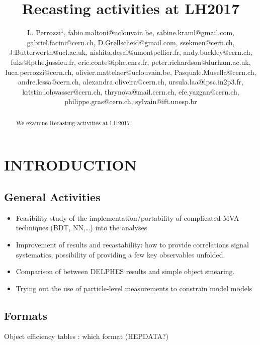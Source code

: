 \documentclass[11pt]{cernrep}
\begin{document}
\title{Recasting activities at LH2017}

\author{L. Perrozzi$^1$, fabio.maltoni@uclouvain.be, sabine.kraml@gmail.com, gabriel.facini@cern.ch, D.Grellscheid@gmail.com, ssekmen@cern.ch, J.Butterworth@ucl.ac.uk, nishita.desai@umontpellier.fr, andy.buckley@cern.ch, fuks@lpthe.jussieu.fr, eric.conte@iphc.cnrs.fr, peter.richardson@durham.ac.uk, luca.perrozzi@cern.ch, olivier.mattelaer@uclouvain.be, Pasquale.Musella@cern.ch, andre.lessa@cern.ch, alexandra.oliveira@cern.ch, ursula.laa@lpsc.in2p3.fr, kristin.lohwasser@cern.ch, thrynova@mail.cern.ch, efe.yazgan@cern.ch, philippe.gras@cern.ch, sylvain@ift.unesp.br}

\maketitle

\begin{abstract}
We examine Recasting activities at LH2017.
\end{abstract}

\section{INTRODUCTION}
\subsection{General Activities}
\begin{itemize}
\item Feasibility study of the implementation/portability of complicated MVA techniques (BDT, NN,…) into the analyses
\item Improvement of results and recastability: how to provide correlations signal systematics, possibility of providing a few key observables unfolded.
\item Comparison of between DELPHES results and simple object smearing.
\item Trying out the use of particle-level measurements to constrain model models
\end{itemize}

\subsection{Formats}
Object efficiency tables : which format (HEPDATA?)
\end{document}
